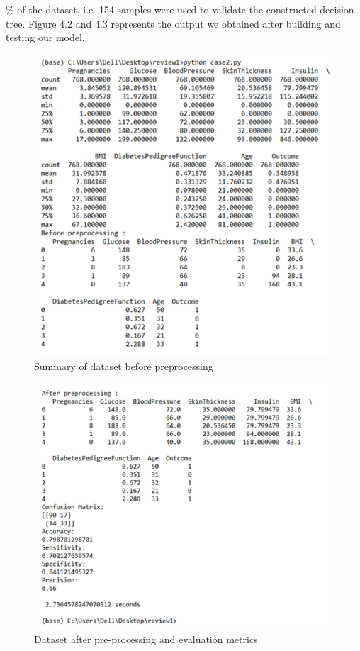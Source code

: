 \% of the dataset, i.e. 154 samples were used to validate the constructed decision tree. Figure 4.2 and 4.3 represents the output we obtained after building and testing our model.
\clearpage
\begin{figure}[h]
\centering
\includegraphics[scale=1.2]{sumbfprp.PNG}
\caption{\label{fig:subBDDs1}Summary of dataset before preprocessing}
\end{figure}
\pagebreak
\clearpage
\pagebreak
\begin{figure}[h]
\centering 
\includegraphics[scale=1.2]{dsfprp.PNG}
\caption{\label{fig:subBDDs1}Dataset after pre-processing and evaluation metrics}
\end{figure}
\pagebreak
\clearpage
